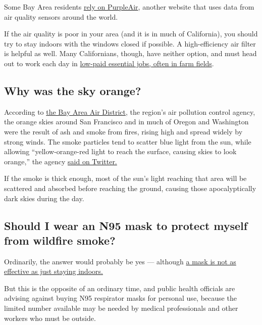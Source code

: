 Some Bay Area residents \href{https://www2.purpleair.com/}{rely on
PurpleAir}, another website that uses data from air quality sensors
around the world.

If the air quality is poor in your area (and it is in much of
California), you should try to stay indoors with the windows closed if
possible. A high-efficiency air filter is helpful as well. Many
Californians, though, have neither option, and must head out to work
each day in
\href{https://www.nytimes3xbfgragh.onion/2020/08/25/climate/california-farm-workers-climate-change.html}{low-paid
essential jobs, often in farm fields}.

\hypertarget{why-was-the-sky-orange}{%
\subsection{Why was the sky orange?}\label{why-was-the-sky-orange}}

According to
\href{https://twitter.com/AirDistrict/status/1303746736414883840}{the
Bay Area Air District}, the region's air pollution control agency, the
orange skies around San Francisco and in much of Oregon and Washington
were the result of ash and smoke from fires, rising high and spread
widely by strong winds. The smoke particles tend to scatter blue light
from the sun, while allowing ``yellow-orange-red light to reach the
surface, causing skies to look orange,'' the agency
\href{https://twitter.com/AirDistrict/status/1303746927171784704}{said
on Twitter.}

If the smoke is thick enough, most of the sun's light reaching that area
will be scattered and absorbed before reaching the ground, causing those
apocalyptically dark skies during the day.

\hypertarget{should-i-wear-an-n95-mask-to-protect-myself-from-wildfire-smoke}{%
\subsection{Should I wear an N95 mask to protect myself from wildfire
smoke?}\label{should-i-wear-an-n95-mask-to-protect-myself-from-wildfire-smoke}}

Ordinarily, the answer would probably be yes --- although
\href{https://www.nytimes3xbfgragh.onion/2020/08/21/us/wildfire-smoke-covid-n95-masks.html}{a
mask is not as effective as just staying indoors.}

But this is the opposite of an ordinary time, and public health
officials are advising against buying N95 respirator masks for personal
use, because the limited number available may be needed by medical
professionals and other workers who must be outside.

